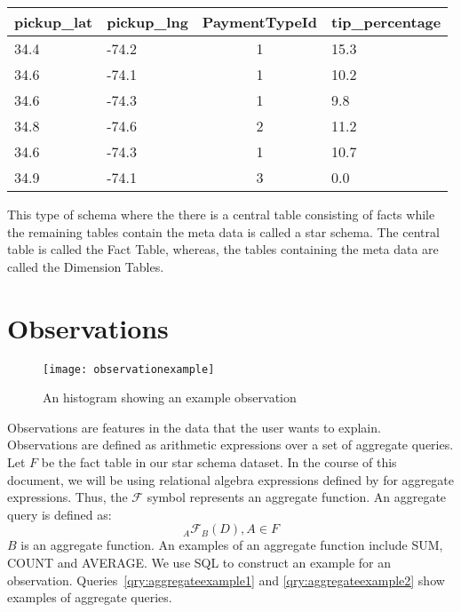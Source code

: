 
\begin{center}
  \begin{tabular}{ | l | l | c | l | }
    \hline
    \textbf{pickup\_lat} & \textbf{pickup\_lng} & \textbf{PaymentTypeId} & \textbf{tip\_percentage} \\ \hline
    34.4 & -74.2 & 1 & 15.3 \\ \hline
    34.6 & -74.1 & 1 & 10.2 \\ \hline
    34.6 & -74.3 & 1 & 9.8 \\ \hline
    34.8 & -74.6 & 2 & 11.2 \\ \hline
    34.6 & -74.3 & 1 & 10.7 \\ \hline
    34.9 & -74.1 & 3 & 0.0 \\
    \hline
  \end{tabular}
\end{center}
\label{tbl:fact}

This type of schema where the there is a central table consisting of facts while the remaining tables contain the meta data is called a star schema. The central table is called the Fact Table, whereas, the tables containing the meta data are called the Dimension Tables.

\section{Observations}
\begin{figure}[ht]
  \begin{center}
  \texttt{[image: observationexample]}
  \end{center}

  \caption{An histogram showing an example observation}
  \label{fig:observation_example}
\end{figure}
Observations are features in the data that the user wants to explain. Observations are defined as arithmetic expressions over a set of aggregate queries. Let $F$ be the fact table in our star schema dataset. In the course of this document, we will be using relational algebra expressions defined by \cite{elmasri2011fundamentals} for aggregate expressions. Thus, the $\mathscr{F}$ symbol represents an aggregate function. An aggregate query is defined as:
$$_A\mathscr{F}_B(D), A \in F$$
$B$ is an aggregate function. An examples of an aggregate function include SUM, COUNT and AVERAGE.
We use SQL to construct an example for an observation. Queries~\ref{qry:aggregateexample1} and \ref{qry:aggregateexample2} show examples of aggregate queries.

